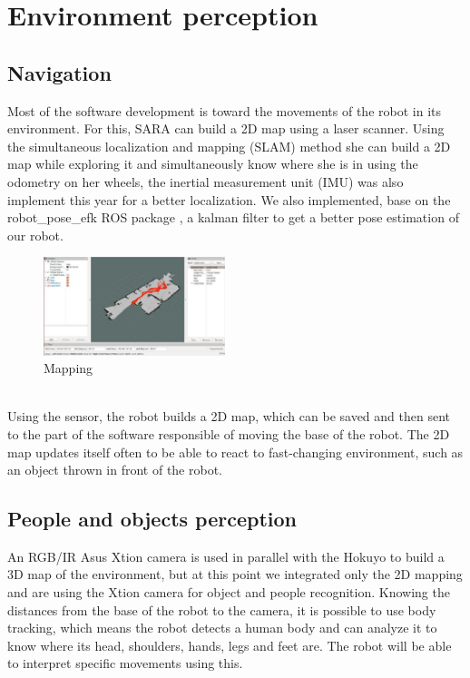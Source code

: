 \documentclass[runningheads,a4paper]{llncs}
\begin{document}
\section{Environment perception}
\subsection{Navigation}
\tab Most of the software development is toward the movements of the robot in its environment. For this, SARA can build a 2D map using a laser scanner. Using the simultaneous localization and mapping (SLAM) method she can build a 2D map while exploring it and simultaneously know where she is in using the odometry on her wheels, the inertial measurement unit (IMU) was also implement this year for a better localization. We also implemented, base on the robot\_pose\_efk ROS package \cite{poseefk}, a kalman filter to get a better pose estimation of our robot. \\
\begin{figure}
  \centering
  \includegraphics[width=150pt]{images/map.jpg}
  \caption{Mapping}
\end{figure}\\
Using the sensor, the robot builds a 2D map, which can be saved and then sent to the part of the software responsible of moving the base of the robot. The 2D map updates itself often to be able to react to fast-changing environment, such as an object thrown in front of the robot.



\subsection{People and objects perception}
\tab An RGB/IR Asus Xtion camera is used in parallel with the Hokuyo to build a 3D map of the environment, but at this point we integrated only the 2D mapping and are using the Xtion camera for object and people recognition. Knowing the distances from the base of the robot to the camera, it is possible to use body tracking, which means the robot detects a human body and can analyze it to know where its head, shoulders, hands, legs and feet are. The robot will be able to interpret specific movements using this. \\
\end{document}
